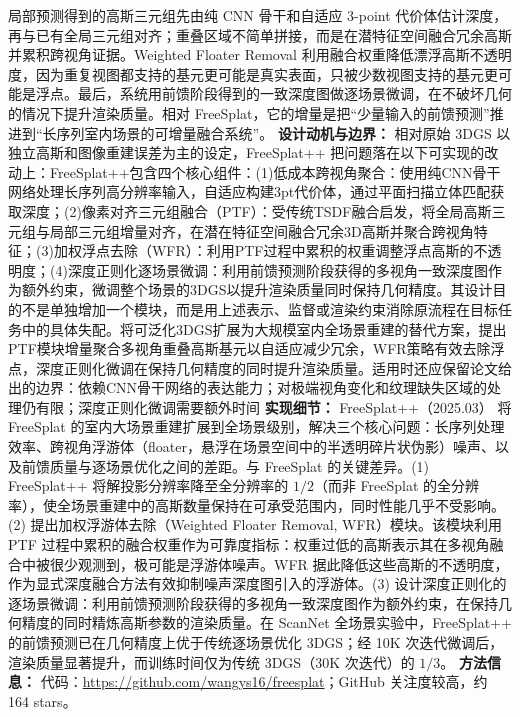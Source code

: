 局部预测得到的高斯三元组先由纯 CNN 骨干和自适应 3-point 代价体估计深度，再与已有全局三元组对齐；重叠区域不简单拼接，而是在潜特征空间融合冗余高斯并累积跨视角证据。Weighted Floater Removal 利用融合权重降低漂浮高斯不透明度，因为重复视图都支持的基元更可能是真实表面，只被少数视图支持的基元更可能是浮点。最后，系统用前馈阶段得到的一致深度图做逐场景微调，在不破坏几何的情况下提升渲染质量。相对 FreeSplat，它的增量是把“少量输入的前馈预测”推进到“长序列室内场景的可增量融合系统”。
\textbf{设计动机与边界：} 相对原始 3DGS 以独立高斯和图像重建误差为主的设定，FreeSplat++ 把问题落在以下可实现的改动上：FreeSplat++包含四个核心组件：(1)低成本跨视角聚合：使用纯CNN骨干网络处理长序列高分辨率输入，自适应构建3pt代价体，通过平面扫描立体匹配获取深度；(2)像素对齐三元组融合（PTF）：受传统TSDF融合启发，将全局高斯三元组与局部三元组增量对齐，在潜在特征空间融合冗余3D高斯并聚合跨视角特征；(3)加权浮点去除（WFR）：利用PTF过程中累积的权重调整浮点高斯的不透明度；(4)深度正则化逐场景微调：利用前馈预测阶段获得的多视角一致深度图作为额外约束，微调整个场景的3DGS以提升渲染质量同时保持几何精度。其设计目的不是单独增加一个模块，而是用上述表示、监督或渲染约束消除原流程在目标任务中的具体失配。将可泛化3DGS扩展为大规模室内全场景重建的替代方案，提出PTF模块增量聚合多视角重叠高斯基元以自适应减少冗余，WFR策略有效去除浮点，深度正则化微调在保持几何精度的同时提升渲染质量。适用时还应保留论文给出的边界：依赖CNN骨干网络的表达能力；对极端视角变化和纹理缺失区域的处理仍有限；深度正则化微调需要额外时间
\textbf{实现细节：} FreeSplat++（2025.03） 将 FreeSplat 的室内大场景重建扩展到全场景级别，解决三个核心问题：长序列处理效率、跨视角浮游体（floater，悬浮在场景空间中的半透明碎片状伪影）噪声、以及前馈质量与逐场景优化之间的差距。与 FreeSplat 的关键差异。(1) FreeSplat++ 将解投影分辨率降至全分辨率的 $1/2$（而非 FreeSplat 的全分辨率），使全场景重建中的高斯数量保持在可承受范围内，同时性能几乎不受影响。(2) 提出加权浮游体去除（Weighted Floater Removal, WFR）模块。该模块利用 PTF 过程中累积的融合权重作为可靠度指标：权重过低的高斯表示其在多视角融合中被很少观测到，极可能是浮游体噪声。WFR 据此降低这些高斯的不透明度，作为显式深度融合方法有效抑制噪声深度图引入的浮游体。(3) 设计深度正则化的逐场景微调：利用前馈预测阶段获得的多视角一致深度图作为额外约束，在保持几何精度的同时精炼高斯参数的渲染质量。在 ScanNet 全场景实验中，FreeSplat++ 的前馈预测已在几何精度上优于传统逐场景优化 3DGS；经 10K 次迭代微调后，渲染质量显著提升，而训练时间仅为传统 3DGS（30K 次迭代）的 $1/3$。
\textbf{方法信息：} 代码：\url{https://github.com/wangys16/freesplat}；GitHub 关注度较高，约 164 stars。



